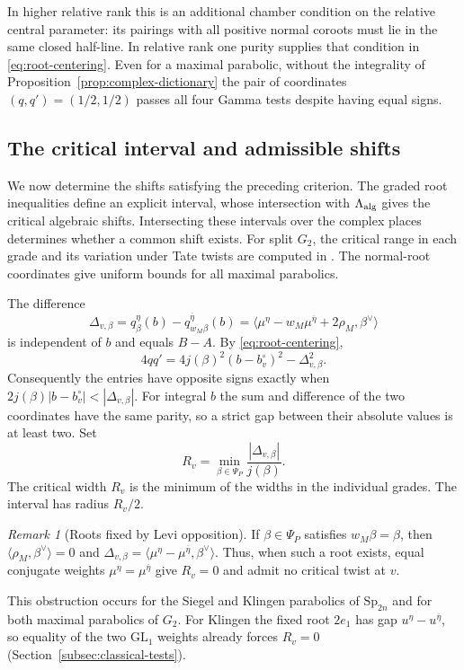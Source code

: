 \documentclass[12pt]{amsart}
\numberwithin{equation}{section}
\theoremstyle{plain}
\theoremstyle{definition}
\theoremstyle{remark}
\newtheorem{remark}[theorem]{Remark}
\renewcommand{\bar}{\overline}
\newcommand{\GL}{\mathrm{GL}}
\newcommand{\Sp}{\mathrm{Sp}}
\begin{document}
In higher relative rank this is an additional chamber condition on the relative central parameter: its pairings with all positive normal coroots must lie in the same closed half-line. In relative rank one purity supplies that condition in \eqref{eq:root-centering}. Even for a maximal parabolic, without the integrality of Proposition~\ref{prop:complex-dictionary} the pair of coordinates $(q,q')=(1/2,1/2)$ passes all four Gamma tests despite having equal signs.

\subsection{The critical interval and admissible shifts}
We now determine the shifts satisfying the preceding criterion. The graded root inequalities define an explicit interval, whose intersection with $\Lambda_{\rm alg}$ gives the critical algebraic shifts. Intersecting these intervals over the complex places determines whether a common shift exists. For split $G_2$, the critical range in each grade and its variation under Tate twists are computed in \cite[\S\S5.1--5.2 and \S6.3]{HosseiniJafariG2}. The normal-root coordinates give uniform bounds for all maximal parabolics.

The difference
\begin{equation}\label{eq:gap}
 \Delta_{v,\beta}=q^\eta_\beta(b)-q^{\bar\eta}_{w_M\beta}(b)
 =\langle\mu^\eta-w_M\mu^{\bar\eta}+2\rho_M,\beta^\vee\rangle
\end{equation}
is independent of $b$ and equals $B-A$. By \eqref{eq:root-centering},
\begin{equation}\label{eq:product}
 4qq'=4j(\beta)^2(b-b_v^\circ)^2-\Delta_{v,\beta}^2.
\end{equation}
Consequently the entries have opposite signs exactly when $2j(\beta)|b-b_v^\circ|<|\Delta_{v,\beta}|$. For integral $b$ the sum and difference of the two coordinates have the same parity, so a strict gap between their absolute values is at least two. Set
\begin{equation}\label{eq:radius}
 R_v=\min_{\beta\in\Psi_P}
           \frac{|\Delta_{v,\beta}|}{j(\beta)}.
\end{equation}
The critical width $R_v$ is the minimum of the widths in the individual grades. The interval has radius $R_v/2$.

\begin{remark}[Roots fixed by Levi opposition]\label{rem:fixed-root}
If $\beta\in\Psi_P$ satisfies $w_M\beta=\beta$, then $\langle\rho_M,\beta^\vee\rangle=0$ and $\Delta_{v,\beta}=\langle\mu^\eta-\mu^{\bar\eta},\beta^\vee\rangle$. Thus, when such a root exists, equal conjugate weights $\mu^\eta=\mu^{\bar\eta}$ give $R_v=0$ and admit no critical twist at $v$.

This obstruction occurs for the Siegel and Klingen parabolics of $\Sp_{2n}$ and for both maximal parabolics of $G_2$. For Klingen the fixed root $2e_1$ has gap $u^\eta-u^{\bar\eta}$, so equality of the two $\GL_1$ weights already forces $R_v=0$ (Section~\ref{subsec:classical-tests}).
\end{remark}
\end{document}
